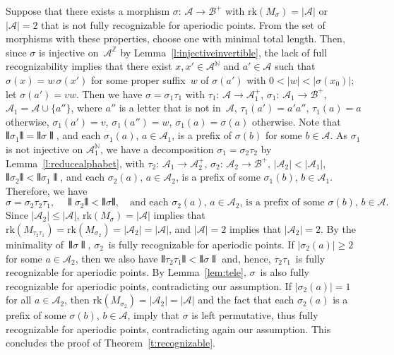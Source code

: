 \documentclass{amsart}
\theoremstyle{definition}
\theoremstyle{remark}
\numberwithin{equation}{section}
\begin{document}
Suppose that there exists a morphism $\sigma:\, \mathcal{A} \to \mathcal{B}^+$ with $\mathrm{rk}(M_\sigma) = |\mathcal{A}|$ or $|\mathcal{A}| = 2$ that is not fully recognizable for aperiodic points.
From the set of morphisms with these properties, choose one with minimal total length.
Then, since $\sigma$ is injective on~$\mathcal{A}^\mathbb{Z}$ by Lemma~\ref{l:injectiveinvertible}, the lack of full recognizability implies that there exist $x, x' \in \mathcal{A}^\mathbb{N}$ and $a' \in \mathcal{A}$ such that $\sigma(x) = w\, \sigma(x')$ for some proper suffix~$w$ of $\sigma(a')$ with $0 < |w| < |\sigma(x_0)|$; let $\sigma(a') = vw$.
Then we have $\sigma = \sigma_1 \tau_1$ with $\tau_1:\, \mathcal{A} \to \mathcal{A}_1^+$, $\sigma_1:\, \mathcal{A}_1 \to \mathcal{B}^+$, $\mathcal{A}_1 = \mathcal{A} \cup \{a''\}$, where $a''$ is a letter that is not in~$\mathcal{A}$, $\tau_1(a') = a' a''$, $\tau_1(a) = a$ otherwise, $\sigma_1(a') = v$, $\sigma_1(a'') = w$, $\sigma_1(a) = \sigma(a)$ otherwise. 
Note that $\interleave\sigma_1\interleave = \interleave\sigma\interleave$, and each $\sigma_1(a)$, $a \in \mathcal{A}_1$, is a prefix of $\sigma(b)$ for some $b \in \mathcal{A}$. 
As $\sigma_1$ is not injective on $\mathcal{A}_1^\mathbb{N}$, we have a decomposition $\sigma_1 = \sigma_2 \tau_2$ by Lemma~\ref{l:reducealphabet}, with $\tau_2:\, \mathcal{A}_1 \to \mathcal{A}_2^+$, $\sigma_2:\, \mathcal{A}_2 \to \mathcal{B}^+$, $|\mathcal{A}_2| < |\mathcal{A}_1|$, $\interleave\sigma_2\interleave < \interleave\sigma_1\interleave$, and each $\sigma_2(a)$, $a \in \mathcal{A}_2$, is a prefix of some $\sigma_1(b)$, $b \in \mathcal{A}_1$. 
Therefore, we have 
\[
\sigma = \sigma_2 \tau_2 \tau_1, \quad \interleave\sigma_2\interleave < \interleave\sigma\interleave, \quad \mbox{and each $\sigma_2(a)$, $a \in \mathcal{A}_2$, is a prefix of some $\sigma(b)$, $b \in \mathcal{A}$}.
\]
Since $|\mathcal{A}_2| \le |\mathcal{A}|$, $\mathrm{rk}(M_\sigma) = |\mathcal{A}|$ implies that $\mathrm{rk}(M_{\tau_2\tau_1}) = \mathrm{rk}(M_{\sigma_2}) = |\mathcal{A}_2| = |\mathcal{A}|$, and $|\mathcal{A}| = 2$ implies that $|\mathcal{A}_2| = 2$. 
By the minimality of~$\interleave\sigma\interleave$, $\sigma_2$~is fully recognizable for aperiodic points.
If $|\sigma_2(a)| \ge 2$ for some $a \in \mathcal{A}_2$, then we also have $\interleave\tau_2\tau_1\interleave < \interleave\sigma\interleave$ and, hence, $\tau_2\tau_1$~is fully recognizable for aperiodic points.
By Lemma~\ref{lem:tele}, $\sigma$~is also fully recognizable for aperiodic points, contradicting our assumption. 
If $|\sigma_2(a)| = 1$ for all $a \in \mathcal{A}_2$, then $\mathrm{rk}(M_{\sigma_2}) = |\mathcal{A}_2| = |\mathcal{A}|$ and the fact that each $\sigma_2(a)$ is a prefix of some $\sigma(b)$, $b \in \mathcal{A}$, imply that $\sigma$ is left permutative, thus fully recognizable for aperiodic points, contradicting again our assumption. 
This concludes the proof of Theorem~\ref{t:recognizable}.
\end{document}
